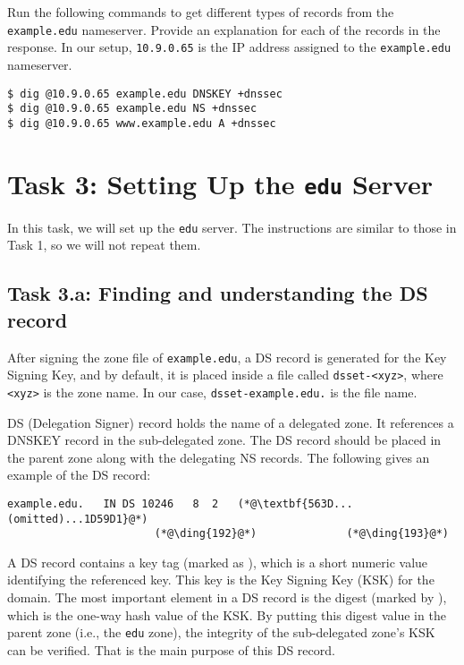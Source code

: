 Run the following commands to get different types of records 
from the \texttt{example.edu} nameserver. Provide an explanation
for each of the records in the response. 
In our setup, \texttt{10.9.0.65} is the IP address 
assigned to the \texttt{example.edu} nameserver.

\begin{lstlisting}
$ dig @10.9.0.65 example.edu DNSKEY +dnssec
$ dig @10.9.0.65 example.edu NS +dnssec
$ dig @10.9.0.65 www.example.edu A +dnssec
\end{lstlisting}
 


\section{Task 3: Setting Up the \texttt{edu} Server}


In this task, we will set up the \texttt{edu} server. 
The instructions are similar to those in Task 1, so we will not repeat them. 


\subsection{Task 3.a: Finding and understanding the DS record}


After signing the zone file of \texttt{example.edu}, a DS record is generated for the Key
Signing Key, and by default, it is placed inside a file called \texttt{dsset-<xyz>}, where
\texttt{<xyz>} is the zone name. In our case, \texttt{dsset-example.edu.} is the file name.


DS (Delegation Signer) record holds the name of a delegated zone. It 
references a DNSKEY record in the sub-delegated zone. 
The DS record should be placed in the parent zone along with the delegating NS records.
The following gives an example of the DS record:


\begin{lstlisting}
example.edu.   IN DS 10246   8  2   (*@\textbf{563D...(omitted)...1D59D1}@*)
                       (*@\ding{192}@*)              (*@\ding{193}@*)
\end{lstlisting}

A DS record contains a key tag (marked as ), which is a 
short numeric value identifying the referenced key. This key
is the Key Signing Key (KSK) for the domain.
The most important element in a DS record is the digest (marked by ),
which is the one-way hash value of the KSK. By putting this digest
value in the parent zone (i.e., the \texttt{edu} zone), 
the integrity of the sub-delegated zone's
KSK can be verified. That is the main purpose of this DS record. 



